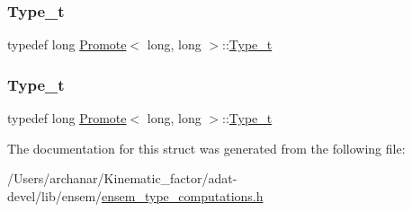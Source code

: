 \subsubsection{\texorpdfstring{Type\_t}{Type\_t}\hspace{0.1cm}{\footnotesize\ttfamily [2/3]}}
{\footnotesize\ttfamily typedef long \mbox{\hyperlink{structPromote}{Promote}}$<$ long, long $>$\+::\mbox{\hyperlink{structPromote_3_01long_00_01long_01_4_a5f00bb17e1f226cbed5e9b1ab9e96081}{Type\+\_\+t}}}

\mbox{\label{structPromote_3_01long_00_01long_01_4_a5f00bb17e1f226cbed5e9b1ab9e96081}} 
\subsubsection{\texorpdfstring{Type\_t}{Type\_t}\hspace{0.1cm}{\footnotesize\ttfamily [3/3]}}
{\footnotesize\ttfamily typedef long \mbox{\hyperlink{structPromote}{Promote}}$<$ long, long $>$\+::\mbox{\hyperlink{structPromote_3_01long_00_01long_01_4_a5f00bb17e1f226cbed5e9b1ab9e96081}{Type\+\_\+t}}}



The documentation for this struct was generated from the following file\+:\begin{DoxyCompactItemize}
\item 
/\+Users/archanar/\+Kinematic\+\_\+factor/adat-\/devel/lib/ensem/\mbox{\hyperlink{adat-devel_2lib_2ensem_2ensem__type__computations_8h}{ensem\+\_\+type\+\_\+computations.\+h}}\end{DoxyCompactItemize}
